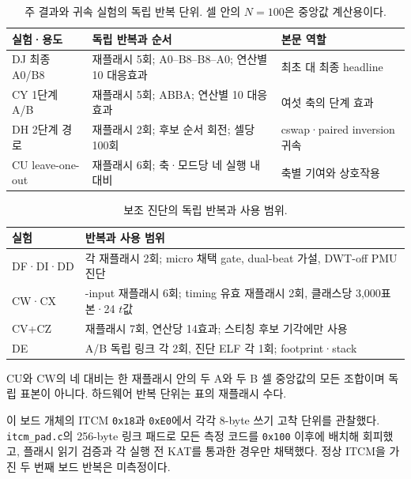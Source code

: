 \documentclass[runningheads,orivec]{llncs}
\begin{document}
\begin{table}[H]\centering\footnotesize
\caption{주 결과와 귀속 실험의 독립 반복 단위. 셀 안의 $N=100$은 중앙값 계산용이다.}
\label{tab:repetitions}
\renewcommand{\arraystretch}{1.08}
\begin{tabularx}{\textwidth}{@{}>{\raggedright\arraybackslash}p{2.5cm}>{\raggedright\arraybackslash}X>{\raggedright\arraybackslash}p{3.1cm}@{}}\toprule
실험·용도 & 독립 반복과 순서 & 본문 역할\\\midrule
DJ 최종 A0/B8 & 재플래시 5회; A0--B8--B8--A0; 연산별 10 대응효과 & 최초 대 최종 headline\\
CY 1단계 A/B & 재플래시 5회; ABBA; 연산별 10 대응효과 & 여섯 축의 단계 효과\\
DH 2단계 경로 & 재플래시 2회; 후보 순서 회전; 셀당 100회 & cswap·paired inversion 귀속\\
CU leave-one-out & 재플래시 6회; 축·모드당 네 실행 내 대비 & 축별 기여와 상호작용\\\bottomrule
\end{tabularx}
\end{table}
\begin{table}[H]\centering\footnotesize
\caption{보조 진단의 독립 반복과 사용 범위.}
\label{tab:repetitions-diagnostic}
\renewcommand{\arraystretch}{1.08}
\begin{tabularx}{\textwidth}{@{}>{\raggedright\arraybackslash}p{2.7cm}>{\raggedright\arraybackslash}X@{}}\toprule
실험 & 반복과 사용 범위\\\midrule
DF·DI·DD & 각 재플래시 2회; micro 채택 gate, dual-beat 가설, DWT-off PMU 진단\\
CW·CX & 8-input 재플래시 6회; timing 유효 재플래시 2회, 클래스당 3,000표본·24 $t$값\\
CV+CZ & 재플래시 7회, 연산당 14효과; 스티칭 후보 기각에만 사용\\
DE & A/B 독립 링크 각 2회, 진단 ELF 각 1회; footprint·stack\\\bottomrule
\end{tabularx}
\end{table}
\FloatBarrier

CU와 CW의 네 대비는 한 재플래시 안의 두 A와 두 B 셀 중앙값의 모든 조합이며
독립 표본이 아니다. 하드웨어 반복 단위는 표의 재플래시 수다.

이 보드 개체의 ITCM \texttt{0x18}과 \texttt{0xE0}에서 각각 8-byte 쓰기 고착 단위를
관찰했다. \texttt{itcm\_pad.c}의 256-byte 링크 패드로 모든 측정 코드를
\texttt{0x100} 이후에 배치해 회피했고, 플래시 읽기 검증과 각 실행 전 KAT를 통과한
경우만 채택했다. 정상 ITCM을 가진 두 번째 보드 반복은 미측정이다.
\end{document}
